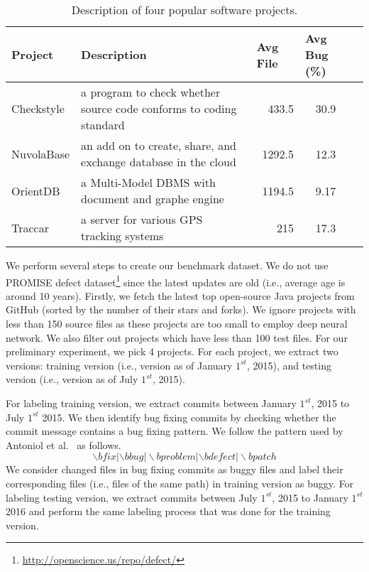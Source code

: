 \begin{table*}[t!]
	\centering
	\caption{Description of four popular software projects.}
	\begin{tabular}{|l|l|r|c|c|}
		\hline
		Project & \multicolumn{1}{l|}{Description}  & \multicolumn{1}{l|}{Avg File} & \multicolumn{1}{l|}{Avg Bug (\%)} \\
		\hline
		\hline
		Checkstyle  &  a program to check whether source code conforms to coding standard & 433.5 & 30.9 \\
		NuvolaBase &  an add on to create, share, and exchange database in the cloud     & 1292.5 & 12.3 \\
		OrientDB &  a Multi-Model DBMS with document and graphe engine  & 1194.5 & 9.17 \\
		Traccar &  a server for various GPS tracking systems & 215   & 17.3 \\
		\hline
	\end{tabular}%
	\label{tab:data}%
\end{table*}%

We perform several steps to create our benchmark dataset. We do not use PROMISE defect dataset\footnote{\url{http://openscience.us/repo/defect/}} since the latest updates are old (i.e., average age is around 10 years). Firstly, we fetch the latest top open-source Java projects from GitHub (sorted by the number of their stars and forks). We ignore projects with less than 150 source files as these projects are too small to employ deep neural network. We also filter out projects which have less than 100 test files. For our preliminary experiment, we pick 4 projects. For each project, we extract two versions: training version (i.e., version as of January $1^{st}$, 2015), and testing version (i.e., version as of July $1^{st}$, 2015). 

For labeling training version, we extract commits between January $1^{st}$, 2015 to July $1^{st}$ 2015. We then identify bug fixing commits by checking whether the commit message contains a bug fixing pattern. We follow the pattern used by Antoniol et al.~\cite{antoniol2008bug} as follows.
\[
\backslash bfix|\backslash bbug|\backslash bproblem|\backslash bdefect|\backslash bpatch
\]
We consider changed files in bug fixing commits as buggy files and label their corresponding files (i.e., files of the same path) in training version as buggy. For labeling testing version, we extract commits between July $1^{st}$, 2015 to January $1^{st}$ 2016 and perform the same labeling process that was done for the training version.

